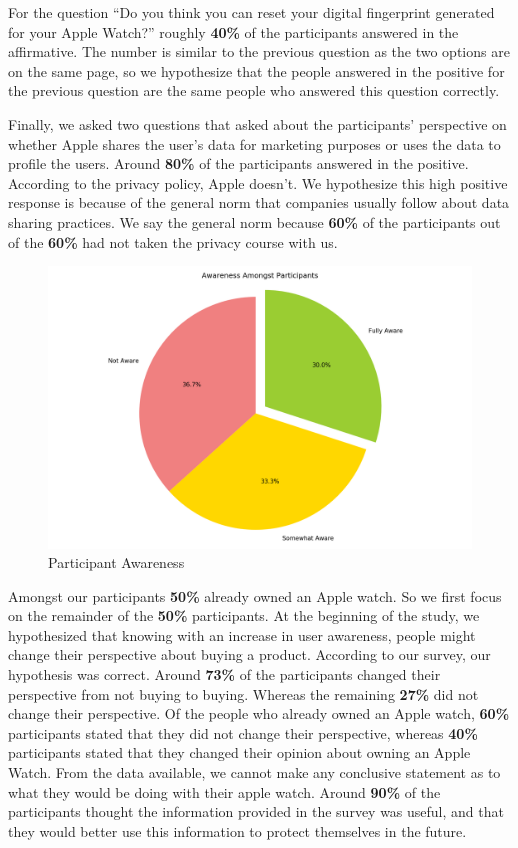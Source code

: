 \documentclass[sigconf]{acmart}
\begin{document}
For the question “Do you think you can reset your digital fingerprint generated for your Apple Watch?” roughly \textbf{40\%} of the participants answered in the affirmative. The number is similar to the previous question as the two options are on the same page, so we hypothesize that the people answered in the positive for the previous question are the same people who answered this question correctly. 

Finally, we asked two questions that asked about the participants' perspective on whether Apple shares the user’s data for marketing purposes or uses the data to profile the users. Around \textbf{80\%} of the participants answered in the positive. According to the privacy policy, Apple doesn’t. We hypothesize this high positive response is because of the general norm that companies usually follow about data sharing practices. We say the general norm because \textbf{60\%} of the participants out of the \textbf{60\%} had not taken the privacy course with us. 

\begin{figure}[h]
  \centering
  \includegraphics[width=\linewidth]{01-AwarenessAmongstParticipants-Apple.png}
  \caption{Participant Awareness}
\end{figure}

Amongst our participants \textbf{50\%} already owned an Apple watch. So we first focus on the remainder of the \textbf{50\%} participants. At the beginning of the study, we hypothesized that knowing with an increase in user awareness, people might change their perspective about buying a product. According to our survey, our hypothesis was correct. Around \textbf{73\%} of the participants changed their perspective from not buying to buying. Whereas the remaining \textbf{27\%} did not change their perspective. Of the people who already owned an Apple watch, \textbf{60\%} participants stated that they did not change their perspective, whereas \textbf{40\%} participants stated that they changed their opinion about owning an Apple Watch. From the data available, we cannot make any conclusive statement as to what they would be doing with their apple watch. Around \textbf{90\%} of the participants thought the information provided in the survey was useful, and that they would better use this information to protect themselves in the future.
\end{document}
